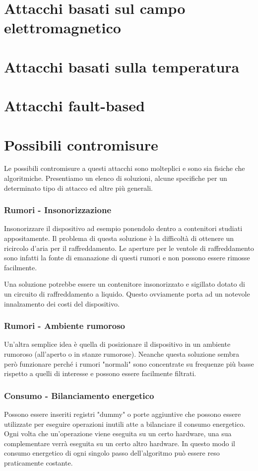 	\section{Attacchi basati sul campo elettromagnetico}
	\lipsum[1-5]
	\section{Attacchi basati sulla temperatura}
	\lipsum[1-5]
	\section{Attacchi fault-based}
	\lipsum[1-5]
	\section{Possibili contromisure}	
		Le possibili contromisure a questi attacchi sono molteplici e sono sia fisiche che algoritmiche. Presentiamo un elenco di soluzioni, alcune specifiche per un determinato tipo di attacco ed altre più generali.
		
		\subsubsection*{Rumori - Insonorizzazione}			
			Insonorizzare il dispositivo ad esempio ponendolo dentro a contenitori studiati appositamente. Il problema di questa soluzione è la difficoltà di ottenere un ricircolo d'aria per il raffreddamento. Le aperture per le ventole di raffreddamento sono infatti la fonte di emanazione di questi rumori e non possono essere rimosse facilmente. 
			
			Una soluzione potrebbe essere un contenitore insonorizzato e sigillato dotato di un circuito di raffreddamento a liquido. Questo ovviamente porta ad un notevole innalzamento dei costi del dispositivo.
		
		\subsubsection*{Rumori - Ambiente rumoroso}
			Un'altra semplice idea è quella di posizionare il dispositivo in un ambiente rumoroso (all'aperto o in stanze rumorose). Neanche questa soluzione sembra però funzionare perché i rumori "normali" sono concentrate su frequenze più basse rispetto a quelli di interesse e possono essere facilmente filtrati.
			
		\subsubsection*{Consumo - Bilanciamento energetico}
			Possono essere inseriti registri "dummy" o porte aggiuntive che possono essere utilizzate per eseguire operazioni inutili atte a bilanciare il consumo energetico. Ogni volta che un'operazione viene eseguita su un certo hardware, una sua complementare verrà eseguita su un certo altro hardware. In questo modo il consumo energetico di ogni singolo passo dell'algoritmo può essere reso praticamente costante.
			
